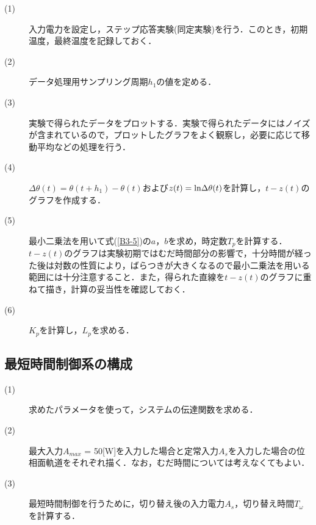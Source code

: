 \documentclass[12pt]{jsarticle}
\begin{document}
\begin{description}
  \item[(1)]入力電力を設定し，ステップ応答実験(同定実験)を行う．このとき，初期温度，最終温度を記録しておく．
  \item[(2)]データ処理用サンプリング周期$h_1$の値を定める．
  \item[(3)]実験で得られたデータをプロットする．実験で得られたデータにはノイズが含まれているので，プロットしたグラフをよく観察し，必要に応じて移動平均などの処理を行う．
  \item[(4)]$\Delta\theta(t) = \theta(t+h_1)-\theta(t)$および$z(t)={\rm ln}\Delta\theta(t)$を計算し，$t-z(t)$のグラフを作成する．
  \item[(5)]最小二乗法を用いて式(\ref{B3-5})の$a，b$を求め，時定数$T_p$を計算する．$t-z(t)$のグラフは実験初期ではむだ時間部分の影響で，十分時間が経った後は対数の性質により，ばらつきが大きくなるので最小二乗法を用いる範囲には十分注意すること．また，得られた直線を$t-z(t)$のグラフに重ねて描き，計算の妥当性を確認しておく．
  \item[(6)]$K_p$を計算し，$L_p$を求める．
\end{description}
\subsection{最短時間制御系の構成}
\begin{description}
\item[(1)]求めたパラメータを使って，システムの伝達関数を求める．
\item[(2)]最大入力$A_{max}$ = 50[W]を入力した場合と定常入力$A_s$を入力した場合の位相面軌道をそれぞれ描く．なお，むだ時間については考えなくてもよい．
\item[(3)]最短時間制御を行うために，切り替え後の入力電力$A_s$，切り替え時間$T_\omega$を計算する．
\end{description}
\end{document}
